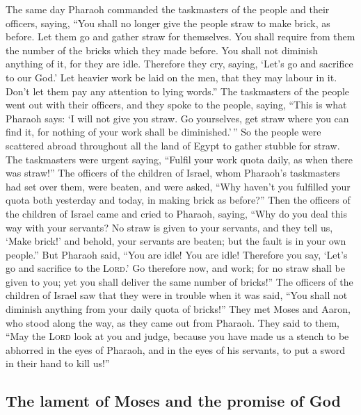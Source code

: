  The same day Pharaoh commanded the taskmasters of the
people and their officers, saying,  ``You shall no longer
give the people straw to make brick, as before. Let them go and gather
straw for themselves.  You shall require from them the
number of the bricks which they made before. You shall not diminish
anything of it, for they are idle. Therefore they cry, saying, `Let's go
and sacrifice to our God.'  Let heavier work be laid on
the men, that they may labour in it. Don't let them pay any attention to
lying words.''  The taskmasters of the people went out
with their officers, and they spoke to the people, saying, ``This is
what Pharaoh says: `I will not give you straw.  Go
yourselves, get straw where you can find it, for nothing of your work
shall be diminished.'\,''  So the people were scattered
abroad throughout all the land of Egypt to gather stubble for straw.
 The taskmasters were urgent saying, ``Fulfil your work
quota daily, as when there was straw!''  The officers of
the children of Israel, whom Pharaoh's taskmasters had set over them,
were beaten, and were asked, ``Why haven't you fulfilled your quota both
yesterday and today, in making brick as before?''  Then
the officers of the children of Israel came and cried to Pharaoh,
saying, ``Why do you deal this way with your servants? 
No straw is given to your servants, and they tell us, `Make brick!' and
behold, your servants are beaten; but the fault is in your own people.''
 But Pharaoh said, ``You are idle! You are idle!
Therefore you say, `Let's go and sacrifice to the \textsc{Lord}.'
 Go therefore now, and work; for no straw shall be given
to you; yet you shall deliver the same number of bricks!''
 The officers of the children of Israel saw that they
were in trouble when it was said, ``You shall not diminish anything from
your daily quota of bricks!''  They met Moses and Aaron,
who stood along the way, as they came out from Pharaoh. 
They said to them, ``May the \textsc{Lord} look at you and judge,
because you have made us a stench to be abhorred in the eyes of Pharaoh,
and in the eyes of his servants, to put a sword in their hand to kill
us!''

\hypertarget{the-lament-of-moses-and-the-promise-of-god}{%
\subsection{The lament of Moses and the promise of
God}\label{the-lament-of-moses-and-the-promise-of-god}}

